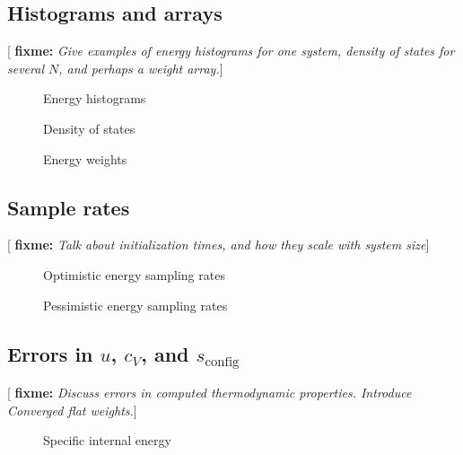\documentclass[11pt]{article}
\renewcommand{\t}{\text} %
\newcommand{\red}[1]{{\bf \color{red} #1}}
\newcommand{\fixme}[1]{[\red{fixme:} \emph{#1}]}
\begin{document}
\subsection{Histograms and arrays}

\fixme{Give examples of energy histograms for one system, density of
  states for several $N$, and perhaps a weight array.}

\begin{figure}[H]
  \centering
  \caption[Energy histograms]{Energy histograms}
  \label{fig:histograms}
\end{figure}

\begin{figure}[H]
  \centering
  \caption[Density of states]{Density of states}
  \label{fig:density_of_states}
\end{figure}

\begin{figure}[H]
  \centering
  \caption[Energy weights]{Energy weights}
  \label{fig:weights}
\end{figure}

\subsection{Sample rates}

\fixme{Talk about initialization times, and how they scale with system
  size}

\begin{figure}[H]
  \centering
  \caption[Optimistic energy sampling rates]{Optimistic energy
    sampling rates}
  \label{fig:opt_sample_rate}
\end{figure}

\begin{figure}[H]
  \centering
  \caption[Pessimistic energy sampling rates]{Pessimistic energy
    sampling rates}
  \label{fig:pes_sample_rate}
\end{figure}

\subsection{Errors in $u$, $c_V$, and $s_{\t{config}}$}

\fixme{Discuss errors in computed thermodynamic properties. Introduce
  Converged flat weights.}

\begin{figure}[H]
  \centering
  \caption[Internal energy]{Specific internal energy}
  \label{fig:u_error}
\end{figure}
\end{document}

